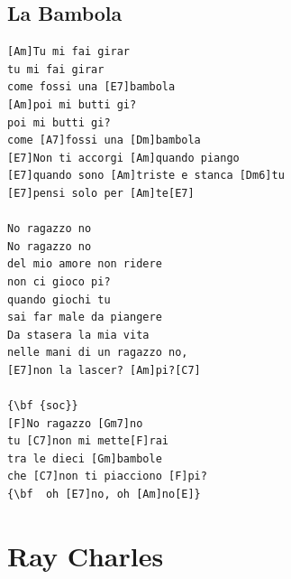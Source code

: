 \documentclass[a4paper]{article}
\begin{document}
\subsection{La Bambola}
\begin{multicols}{2}\begin{Verbatim}[commandchars=\\\{\}]
[Am]Tu mi fai girar
tu mi fai girar
come fossi una [E7]bambola
[Am]poi mi butti gi?
poi mi butti gi?
come [A7]fossi una [Dm]bambola
[E7]Non ti accorgi [Am]quando piango
[E7]quando sono [Am]triste e stanca [Dm6]tu
[E7]pensi solo per [Am]te[E7]

No ragazzo no
No ragazzo no
del mio amore non ridere
non ci gioco pi?
quando giochi tu
sai far male da piangere
Da stasera la mia vita
nelle mani di un ragazzo no,
[E7]non la lascer? [Am]pi?[C7]

{\bf {soc}}
[F]No ragazzo [Gm7]no
tu [C7]non mi mette[F]rai
tra le dieci [Gm]bambole
che [C7]non ti piacciono [F]pi?
{\bf  oh [E7]no, oh [Am]no[E]}

\end{Verbatim}
\end{multicols}\newpage
\section{Ray Charles}
\end{document}
